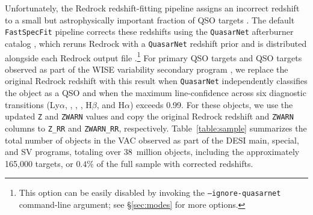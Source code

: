 \documentclass[modern,linenumbers]{aastex702}
\newcommand{\fastspecfit}{\texttt{FastSpecFit}}
\newcommand{\mgii}{\ion{Mg}{2}}
\newcommand{\ha}{\ensuremath{\mathrm{H}\alpha}}
\newcommand{\hb}{\ensuremath{\mathrm{H}\beta}}
\begin{document}
Unfortunately, the Redrock redshift-fitting pipeline assigns an
incorrect redshift to a small but astrophysically important fraction
of QSO targets \citep{chaussidon23a, adame25e}. The default
\fastspecfit{} pipeline corrects these redshifts using the
\texttt{QuasarNet} afterburner catalog \citep{green25a}, which
  reruns Redrock with a \texttt{QuasarNet} redshift prior and is
distributed alongside each Redrock output file
\citep{desi-collaboration24d, desi-collaboration26a}.\footnote{This
option can be easily disabled by invoking the
\texttt{--ignore-quasarnet} command-line argument; see
\S\ref{sec:modes} for more options.}  For primary QSO targets and QSO
targets observed as part of the WISE variability secondary program
\citep{chaussidon23a, myers23a}, we replace the original
Redrock redshift with this result when \texttt{QuasarNet}
independently classifies the object as a QSO and when the maximum
line-confidence across six diagnostic transitions (Ly$\alpha$,
, , \mgii, \hb, and \ha) exceeds 0.99. For these
objects, we use the updated \texttt{Z} and \texttt{ZWARN} values and
copy the original Redrock redshift and \texttt{ZWARN} columns to
\texttt{Z\_RR} and \texttt{ZWARN\_RR},
respectively. Table~\ref{table:sample} summarizes the total number of
objects in the VAC observed as part of the DESI main, special, and SV
programs, totaling over 38~million objects, including the
approximately 165,000 targets, or $0.4\%$ of the full sample with
corrected redshifts.
\end{document}
